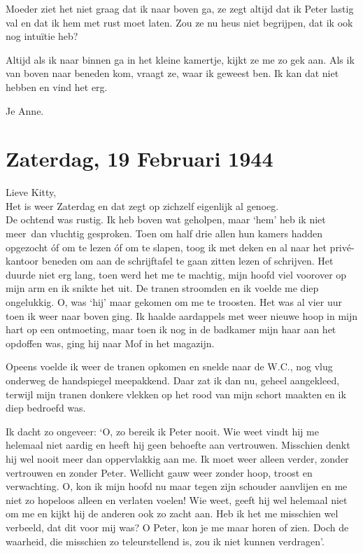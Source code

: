 \documentclass{book}
\begin{document}
Moeder ziet het niet graag dat ik naar boven ga, ze zegt altijd dat ik
Peter lastig val en dat ik hem met rust moet laten. Zou ze nu heus niet
begrijpen, dat ik ook nog intuïtie heb?

Altijd als ik naar binnen ga in het kleine kamertje, kijkt ze me zo gek
aan. Als ik van boven naar beneden kom, vraagt ze, waar ik geweest ben.
Ik kan dat niet hebben en vind het erg.

Je Anne.

\chapter{Zaterdag, 19 Februari 1944}

Lieve Kitty,\\Het is weer Zaterdag en dat zegt op zichzelf eigenlijk al
genoeg.\\De ochtend was rustig. Ik heb boven wat geholpen, maar `hem'
heb ik niet meer~dan vluchtig gesproken. Toen om half drie allen hun
kamers hadden opgezocht óf om te lezen óf om te slapen, toog ik met
deken en al naar het privé-kantoor beneden om aan de schrijftafel te
gaan zitten lezen of schrijven. Het duurde niet erg lang, toen werd het
me te machtig, mijn hoofd viel voorover op mijn arm en ik snikte het
uit. De tranen stroomden en ik voelde me diep ongelukkig. O, was `hij'
maar gekomen om me te troosten. Het was al vier uur toen ik weer naar
boven ging. Ik haalde aardappels met weer nieuwe hoop in mijn hart op
een ontmoeting, maar toen ik nog in de badkamer mijn haar aan het
opdoffen was, ging hij naar Mof in het magazijn.

Opeens voelde ik weer de tranen opkomen en snelde naar de W.C., nog vlug
onderweg de handspiegel meepakkend. Daar zat ik dan nu, geheel
aangekleed, terwijl mijn tranen donkere vlekken op het rood van mijn
schort maakten en ik diep bedroefd was.

Ik dacht zo ongeveer: `O, zo bereik ik Peter nooit. Wie weet vindt hij
me helemaal niet aardig en heeft hij geen behoefte aan vertrouwen.
Misschien denkt hij wel nooit meer dan oppervlakkig aan me. Ik moet weer
alleen verder, zonder vertrouwen en zonder Peter. Wellicht gauw weer
zonder hoop, troost en verwachting. O, kon ik mijn hoofd nu maar tegen
zijn schouder aanvlijen en me niet zo hopeloos alleen en verlaten
voelen! Wie weet, geeft hij wel helemaal niet om me en kijkt hij de
anderen ook zo zacht aan. Heb ik het me misschien wel verbeeld, dat dit
voor mij was? O Peter, kon je me maar horen of zien. Doch de waarheid,
die misschien zo teleurstellend is, zou ik niet kunnen verdragen'.
\end{document}
